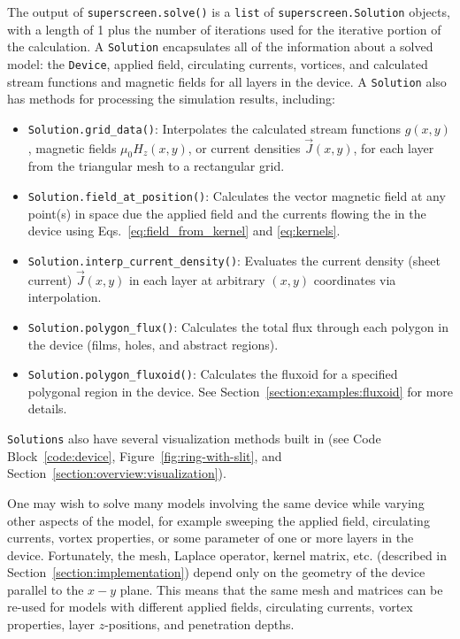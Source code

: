 \documentclass[final,3p,times]{elsarticle}
\newcommand{\inline}[1]{\texttt{#1}\xspace}
\begin{document}
The output of \inline{superscreen.solve()} is a \inline{list} of \inline{superscreen.Solution} objects, with a length of 1 plus the number of iterations used for the iterative portion of the calculation. A \inline{Solution} encapsulates all of the information about a solved model: the \inline{Device}, applied field, circulating currents, vortices, and calculated stream functions and magnetic fields for all layers in the device. A \inline{Solution} also has methods for processing the simulation results, including:
\begin{itemize}
    \item{
    \inline{Solution.grid_data()}: Interpolates the calculated stream functions $g(x, y)$, magnetic fields $\mu_0H_z(x, y)$, or current densities $\vec{J}(x, y)$, for each layer from the triangular mesh to a rectangular grid.
    }
    \item{
    \inline{Solution.field_at_position()}: Calculates the vector magnetic field at any point(s) in space due the applied field and the currents flowing the in the device using Eqs.~\ref{eq:field_from_kernel} and \ref{eq:kernels}.
    }
    \item{
    \inline{Solution.interp_current_density()}: Evaluates the current density (sheet current) $\vec{J}(x, y)$ in each layer at arbitrary $(x, y)$ coordinates via interpolation.
    }
    \item{
    \inline{Solution.polygon_flux()}: Calculates the total flux through each polygon in the device (films, holes, and abstract regions).
    }
    \item{
    \inline{Solution.polygon_fluxoid()}: Calculates the fluxoid for a specified polygonal region in the device. See Section~\ref{section:examples:fluxoid} for more details.
    }
\end{itemize}
\inline{Solutions} also have several visualization methods built in (see Code Block~\ref{code:device}, Figure~\ref{fig:ring-with-slit}, and Section~\ref{section:overview:visualization}).

One may wish to solve many models involving the same device while varying other aspects of the model, for example sweeping the applied field, circulating currents, vortex properties, or some parameter of one or more layers in the device. Fortunately, the mesh, Laplace operator, kernel matrix, etc. (described in Section~\ref{section:implementation}) depend only on the geometry of the device parallel to the $x-y$ plane. This means that the same mesh and matrices can be re-used for models with different applied fields, circulating currents, vortex properties, layer $z$-positions, and penetration depths.
\end{document}
